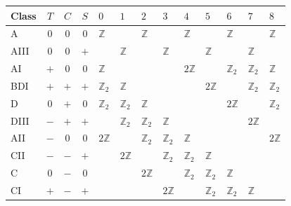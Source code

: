 \documentclass{svmono}
\begin{document}
\begin{table}
    \centering
    \addtolength{\tabcolsep}{0.25cm}
    \renewcommand{\arraystretch}{1.25} \begin{tabular}{l | c c c | l l l l l l l l l}
        \hline\hline
        Class   & $T$ & $C$ & $S$ & $0$ & $1$ & $2$ & $3$ & $4$ & $5$ & $6$ & $7$ & $8$\\
        \hline
        A       & $0$ & $0$ & $0$ & $\mathds Z$   &               & $\mathds Z$   &               & $\mathds Z$   &               & $\mathds Z$   &               & $\mathds Z$   \\
        AIII    & $0$ & $0$ & $+$ &               & $\mathds Z$   &               & $\mathds Z$   &               & $\mathds Z$   &               & $\mathds Z$   &               \\
        \hline
        AI      & $+$ & $0$ & $0$ & $\mathds Z$   &               &               &               & $2\mathds Z$  &               & $\mathds Z_2$ & $\mathds Z_2$ & $\mathds Z$   \\
        BDI     & $+$ & $+$ & $+$ & $\mathds Z_2$ & $\mathds Z$   &               &               &               & $2\mathds Z$  &               & $\mathds Z_2$ & $\mathds Z_2$ \\
        D       & $0$ & $+$ & $0$ & $\mathds Z_2$ & $\mathds Z_2$ & $\mathds Z$   &               &               &               & $2\mathds Z$  &               & $\mathds Z_2$ \\
        DIII    & $-$ & $+$ & $+$ &               & $\mathds Z_2$ & $\mathds Z_2$ & $\mathds Z$   &               &               &               & $2\mathds Z$  &               \\
        AII     & $-$ & $0$ & $0$ & $2\mathds Z$  &               & $\mathds Z_2$ & $\mathds Z_2$ & $\mathds Z$   &               &               &               & $2\mathds Z$  \\
        CII     & $-$ & $-$ & $+$ &               & $2\mathds Z$  &               & $\mathds Z_2$ & $\mathds Z_2$ & $\mathds Z$   &               &               &               \\
        C       & $0$ & $-$ & $0$ &               &               & $2\mathds Z$  &               & $\mathds Z_2$ & $\mathds Z_2$ & $\mathds Z$   &               &               \\
        CI      & $+$ & $-$ & $+$ &               &               &               & $2\mathds Z$  &               & $\mathds Z_2$ & $\mathds Z_2$ & $\mathds Z$   &               \\

\end{tabular}
\end{table}
\end{document}
